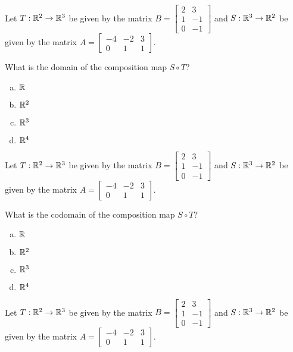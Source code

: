 \begin{applicationActivities}{1}{21}
\begin{activity}{3}
Let $T: \mathbb{R}^2 \rightarrow \mathbb{R}^3$ be given by the matrix $B=\begin{bmatrix} 2 & 3 \\ 1 & -1 \\ 0 & -1 \end{bmatrix}$ and $S: \mathbb{R}^3 \rightarrow \mathbb{R}^2$ be given by the matrix $A=\begin{bmatrix} -4 & -2 & 3 \\ 0 & 1 & 1 \end{bmatrix}$.

What is the domain of the composition map $S \circ T$?
\begin{enumerate}[(a)]
\item $\mathbb{R}$
\item $\mathbb{R}^2$
\item $\mathbb{R}^3$
\item $\mathbb{R}^4$
\end{enumerate}
\end{activity}

\begin{activity}{3}
Let $T: \mathbb{R}^2 \rightarrow \mathbb{R}^3$ be given by the matrix $B=\begin{bmatrix} 2 & 3 \\ 1 & -1 \\ 0 & -1 \end{bmatrix}$ and $S: \mathbb{R}^3 \rightarrow \mathbb{R}^2$ be given by the matrix $A=\begin{bmatrix} -4 & -2 & 3 \\ 0 & 1 & 1 \end{bmatrix}$.

What is the codomain of the composition map $S \circ T$?
\begin{enumerate}[(a)]
\item $\mathbb{R}$
\item $\mathbb{R}^2$
\item $\mathbb{R}^3$
\item $\mathbb{R}^4$
\end{enumerate}
\end{activity}

\begin{activity}{3}
Let $T: \mathbb{R}^2 \rightarrow \mathbb{R}^3$ be given by the matrix $B=\begin{bmatrix} 2 & 3 \\ 1 & -1 \\ 0 & -1 \end{bmatrix}$ and $S: \mathbb{R}^3 \rightarrow \mathbb{R}^2$ be given by the matrix $A=\begin{bmatrix} -4 & -2 & 3 \\ 0 & 1 & 1 \end{bmatrix}$.


\end{activity}
\end{applicationActivities}
